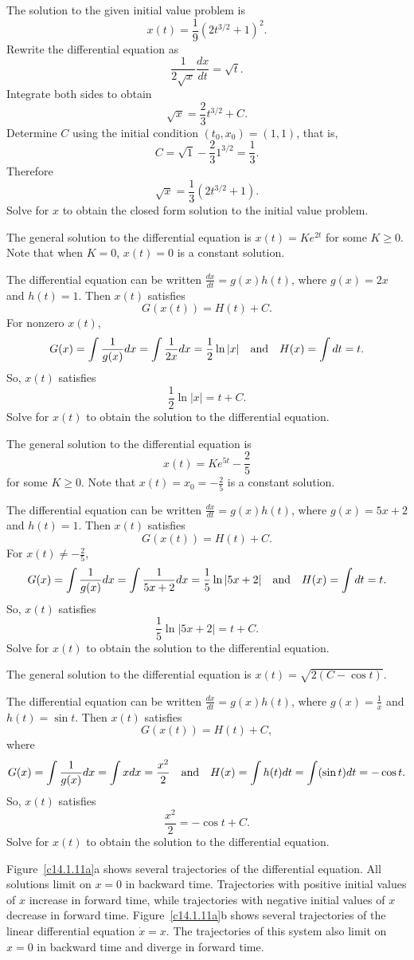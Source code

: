  \ans The solution to the given initial value problem is
\[
x(t) = \frac{1}{9}(2t^{3/2} + 1)^2.
\]
\soln Rewrite the differential equation as 
\[
\frac{1}{2\sqrt{x}}\frac{dx}{dt} = \sqrt{t}.
\]
Integrate both sides to obtain
\[
\sqrt{x} = \frac{2}{3}t^{3/2} + C.
\]
Determine $C$ using the initial condition $(t_0,x_0)=(1,1)$, that is,
\[
C = \sqrt{1} - \frac{2}{3}1^{3/2} = \frac{1}{3}.
\]
Therefore
\[
\sqrt{x} = \frac{1}{3}(2t^{3/2} + 1).
\]
Solve for $x$ to obtain the closed form solution to the initial value problem.

 \ans The general solution to the differential equation is
$x(t) = Ke^{2t}$ for some $K \geq 0$.  Note that when $K = 0$, $x(t) = 0$ is
a constant solution.


\soln The differential equation can be written $\frac{dx}{dt} = g(x)h(t)$,
where $g(x) = 2x$ and $h(t) = 1$.  Then $x(t)$ satisfies
\[
G(x(t)) = H(t) + C.
\]
For nonzero $x(t)$,
\[
G(x) = \int\frac{1}{g(x)}dx = \int\frac{1}{2x}dx = \frac{1}{2}\ln|x|
\quad\mbox{and}\quad
H(x) = \int dt = t.
\]
So, $x(t)$ satisfies
\[
\frac{1}{2}\ln|x| = t + C.
\]
Solve for $x(t)$ to obtain the solution to the differential equation.


 \ans The general solution to the differential equation is 
\[
x(t) = Ke^{5t} - \frac{2}{5}
\]
for some $K \geq 0$.  Note that $x(t) = x_0 = -\frac{2}{5}$ is a constant
solution.

\soln The differential equation can be written $\frac{dx}{dt} = g(x)h(t)$,
where $g(x) = 5x + 2$ and $h(t) = 1$.  Then $x(t)$ satisfies
\[
G(x(t)) = H(t) + C.
\]
For $x(t) \neq -\frac{2}{5}$,
\[
G(x) = \int\frac{1}{g(x)}dx = \int\frac{1}{5x + 2}dx = \frac{1}{5}\ln|5x + 2|
\quad\mbox{and}\quad
H(x) = \int dt = t.
\]
So, $x(t)$ satisfies
\[
\frac{1}{5}\ln|5x + 2| = t + C.
\]
Solve for $x(t)$ to obtain the solution to the differential equation.


 \ans The general solution to the differential equation is
$x(t) = \sqrt{2(C - \cos t)}$.

\soln The differential equation can be written $\frac{dx}{dt} = g(x)h(t)$,
where $g(x) = \frac{1}{x}$ and $h(t) = \sin t$.  Then $x(t)$ satisfies
\[
G(x(t)) = H(t) + C,
\]
where
\[
G(x) = \int\frac{1}{g(x)}dx = \int xdx = \frac{x^2}{2}
\quad\mbox{and}\quad
H(x) = \int h(t)dt = \int(\sin t)dt = -\cos t.
\]
So, $x(t)$ satisfies
\[
\frac{x^2}{2} = -\cos t + C.
\]
Solve for $x(t)$ to obtain the solution to the differential equation.

 Figure~\ref{c14.1.11a}a shows several trajectories of the
differential equation.  All solutions limit on $x = 0$ in backward
time.  Trajectories with positive initial values of $x$ increase in
forward time, while trajectories with negative initial values of $x$
decrease in forward time.  Figure~\ref{c14.1.11a}b shows several trajectories
of the linear differential equation $\dot{x} = x$.  The trajectories of this
system also limit on $x = 0$ in backward time and diverge in forward time.

